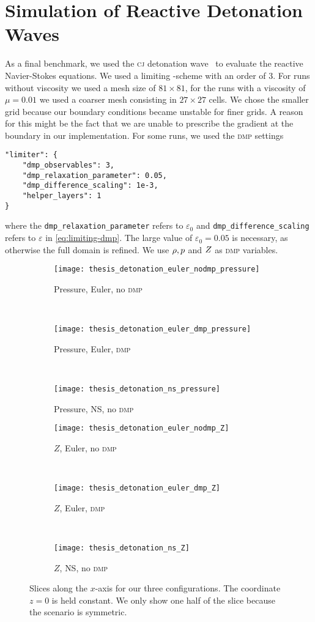\section{Simulation of Reactive Detonation Waves}\label{sec:results-reactive}
As a final benchmark, we used the \textsc{cj} detonation wave~ to evaluate the reactive Navier-Stokes equations.
We used a limiting \aderdg{}-scheme with an order of 3.
For runs without viscosity we used a mesh size of $81 \times 81$, for the runs with a viscosity of $\mu = 0.01$ we used a coarser mesh consisting in $27 \times 27$ cells.
We chose the smaller grid because our boundary conditions became unstable for finer grids.
A reason for this might be the fact that we are unable to prescribe the gradient at the boundary in our \muscl{} implementation.
For some runs, we used the \textsc{dmp} settings
\begin{verbatim}
"limiter": {
    "dmp_observables": 3,
    "dmp_relaxation_parameter": 0.05,
    "dmp_difference_scaling": 1e-3,
    "helper_layers": 1
}
\end{verbatim}
where the \texttt{dmp\_relaxation\_parameter} refers to $\varepsilon_0$ and \texttt{dmp\_difference\_scaling} refers to $\varepsilon$ in \cref{eq:limiting-dmp}.
The large value of $\varepsilon_0 = 0.05$ is necessary, as otherwise the full domain is refined.
We use $\rho, p$ and $Z$ as \textsc{dmp} variables.
\begin{figure}[t]
  \centering
  \begin{subfigure}[t]{0.3\textwidth}
    \centering
    \texttt{[image: thesis\_detonation\_euler\_nodmp\_pressure]}
    \caption{Pressure, Euler, no \textsc{dmp}}
  \end{subfigure}~%
  \begin{subfigure}[t]{0.3\textwidth}
    \centering
    \texttt{[image: thesis\_detonation\_euler\_dmp\_pressure]}
    \caption{Pressure, Euler, \textsc{dmp}}
  \end{subfigure}~%
  \begin{subfigure}[t]{0.3\textwidth}
    \centering
    \texttt{[image: thesis\_detonation\_ns\_pressure]}
    \caption{Pressure, \textsc{NS}, no \textsc{dmp}}
  \end{subfigure}

  \begin{subfigure}[t]{0.3\textwidth}
    \centering
    \texttt{[image: thesis\_detonation\_euler\_nodmp\_Z]}
    \caption{$Z$, Euler, no \textsc{dmp}}
  \end{subfigure}~%
  \begin{subfigure}[t]{0.3\textwidth}
    \centering
    \texttt{[image: thesis\_detonation\_euler\_dmp\_Z]}
    \caption{$Z$, Euler, \textsc{dmp}}
  \end{subfigure}~%
  \begin{subfigure}[t]{0.3\textwidth}
    \centering
    \texttt{[image: thesis\_detonation\_ns\_Z]}
    \caption{$Z$, \textsc{NS}, no \textsc{dmp}}
  \end{subfigure}
  \caption{\label{fig:detonation-line-plots}%
    Slices along the $x$-axis for our three configurations.
    The coordinate $z = 0$ is held constant.
    We only show one half of the slice because the scenario is symmetric.
  }
\end{figure}
